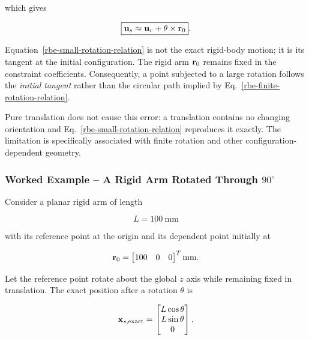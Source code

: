 which gives

\begin{equation}\label{rbe-small-rotation-relation}
    \boxed{\mathbf{u}_s\approx\mathbf{u}_r+\mathbf{\theta}\times\mathbf{r}_0}.
\end{equation}

Equation~\eqref{rbe-small-rotation-relation} is not the exact rigid-body motion;
it is its tangent at the initial configuration. The rigid arm $\mathbf{r}_0$ remains
fixed in the constraint coefficients. Consequently, a point subjected to a
large rotation follows the \emph{initial tangent} rather than the circular path
implied by Eq.~\eqref{rbe-finite-rotation-relation}.

Pure translation does not cause this error: a translation contains no changing
orientation and Eq.~\eqref{rbe-small-rotation-relation} reproduces it exactly.
The limitation is specifically associated with finite rotation and other
configuration-dependent geometry.


\subsubsection{Worked Example -- A Rigid Arm Rotated Through $90^\circ$}

Consider a planar rigid arm of length

\begin{equation}
    L=100~\mathrm{mm}
\end{equation}

with its reference point at the origin and its dependent point initially at

\begin{equation}
    \mathbf{r}_0=
    \begin{bmatrix}
        100 & 0 & 0
    \end{bmatrix}^{T}\mathrm{mm}.
\end{equation}

Let the reference point rotate about the global $z$ axis while remaining fixed
in translation. The exact position after a rotation $\theta$ is

\begin{equation}\label{rbe-rotation-example-exact}
    \mathbf{x}_{s,\mathrm{exact}}
    =
    \begin{bmatrix}
        L\cos\theta\\
        L\sin\theta\\
        0
    \end{bmatrix},
\end{equation}

